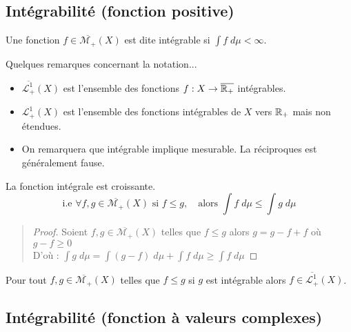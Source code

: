\subsection{Intégrabilité (fonction positive)}

\begin{definition}
    Une fonction $f \in \overline{\mathcal{M}_+}(X)$ est dite intégrable si $\int f \;d \mu < \infty $.
\end{definition}

\begin{remark}
    Quelques remarques concernant la notation... 
    \begin{itemize}
        \item $\overline{\mathcal{L}_+^1}(X)$ est l'ensemble des fonctions $f : X \rightarrow \overline{\mathbb{R}_+}$ intégrables.
        \item ${\mathcal{L}_+^1}(X)$ est l'ensemble des fonctions intégrables de $X$ vers $\mathbb{R}_+$ mais non étendues.
        \item On remarquera que intégrable implique mesurable. La réciproques est généralement fause.
    \end{itemize}
\end{remark}

\begin{prop}
    La fonction intégrale est croissante.
    \[ \text{i.e } \forall f,g \in \overline{\mathcal{M}_+}(X) \text{ si } f \leq g, \quad \text{alors } \int f \; d \mu \leq \int g \; d \mu \] 
\end{prop}

\begin{quote}
    \footnotesize 
    \begin{proof}
        Soient $f, g \in \overline{\mathcal{M}_+}(X)$ telles que $f \leq g$ alors $g = g-f+f$ où $g-f \geq 0 $ \\
        D'où : $ \int g \; d \mu = \int (g-f) \; d \mu + \int f \; d \mu \geq \int f \; d \mu $
    \end{proof}
    \normalsize
\end{quote}

\begin{remark}
    Pour tout $f,g \in \overline{\mathcal{M}_+}(X)$ telles que $f \leq g$ si $g$ est intégrable alors $f \in \overline{\mathcal{L}_+^1}(X)$.
\end{remark}

\subsection{Intégrabilité (fonction à valeurs complexes)}

